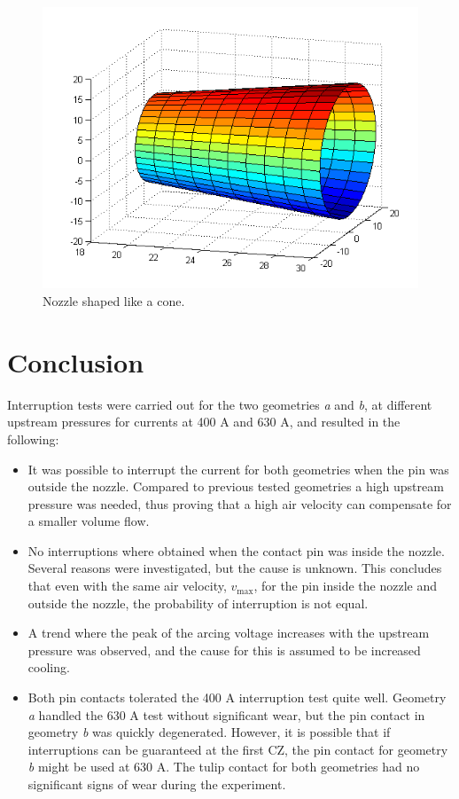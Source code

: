 \documentclass[10pt,a4paper,twoside]{article}
\begin{document}
\begin{figure}[H]
\centering
\includegraphics[scale=0.36]{Bilder/Discussion/cone_D16.png}
\caption{Nozzle shaped like a cone.} \label{fig:cone_D16}
\end{figure}

\cleardoublepage

\section{Conclusion}
Interruption tests were carried out for the two geometries \textit{a} and \textit{b}, at different upstream pressures for currents at 400 A and 630 A, and resulted in the following:
\begin{itemize}
\item	It was possible to interrupt the current for both geometries when the pin was outside the nozzle. Compared to previous tested geometries a high upstream pressure was needed, thus proving that a high air velocity can compensate for a smaller volume flow.
\item	No interruptions where obtained when the contact pin was inside the nozzle. Several reasons were investigated, but the cause is unknown. This concludes that even with the same air velocity, $v_\mathrm{{max}}$, for the pin inside the nozzle and outside the nozzle, the probability of interruption is not equal. 
\item	A trend where the peak of the arcing voltage increases with the upstream pressure was observed, and the cause for this is assumed to be increased cooling.
\item Both pin contacts tolerated the 400 A interruption test quite well. Geometry \textit{a} handled the 630 A test without significant wear, but the pin contact in geometry \textit{b} was quickly degenerated. However, it is possible that if interruptions can be guaranteed at the first CZ, the pin contact for geometry \textit{b} might be used at 630 A. The tulip contact for both geometries had no significant signs of wear during the experiment.
\end{itemize}
\end{document}
